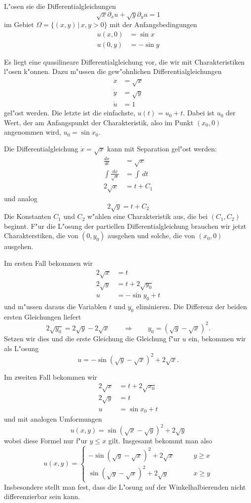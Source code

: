 L"osen sie die Differentialgleichungen
\[
\sqrt{x}\partial_x u+\sqrt{y}\partial_yu=1
\]
im Gebiet $\Omega=\{(x,y)\,|\, x,y>0\}$
mit der Anfangsbedingungen
\begin{align*}
u(x,0)&=\sin x\\
u(0,y)&=-\sin y
\end{align*}

\begin{loesung}
Es liegt eine quasilineare Differentialgleichung vor, die wir mit
Charakteristiken l"osen k"onnen. Dazu m"ussen die gew"ohnlichen
Differentialgleichungen
\begin{align*}
\dot x &=\sqrt{x} \\
\dot y &=\sqrt{y} \\
\dot u &=1
\end{align*}
gel"ost werden. Die letzte ist die einfachste, $u(t)=u_0 + t$. Dabei
ist $u_0$ der Wert, der am Anfangspunkt der Charakteristik, also
im Punkt $(x_0,0)$ angenommen wird, $u_0=\sin x_0$.

Die Differentialgleichung $\dot x=\sqrt{x}$ kann mit Separation
gel"ost werden:
\begin{align*}
\frac{dx}{dt}&=\sqrt{x}\\
\int\frac{dx}{\sqrt{x}}&=\int\,dt\\
2\sqrt{x}&=t+C_1
\end{align*}
und analog
\[
2\sqrt{y}=t+C_2
\]
Die Konstanten $C_1$ und $C_2$ w"ahlen eine Charakteristik aus,
die bei $(C_1,C_2)$ beginnt.
F"ur die L"osung der partiellen Differentialgleichung brauchen wir
jetzt Charakterstiken, die von $(0,y_0)$  ausgehen und solche, die
von $(x_0,0)$ ausgehen.

Im ersten Fall bekommen wir
\begin{align*}
2\sqrt{x}&=t\\
2\sqrt{y}&=t+2\sqrt{y_0}\\
u&=-\sin y_0 + t
\end{align*}
und m"ussen daraus die Variablen $t$ und $y_0$ eliminieren.
Die Differenz der beiden ersten Gleichungen liefert
\[
2\sqrt{y_0}=2\sqrt{y}-2\sqrt{x}
\qquad\Rightarrow\qquad
y_0
=
(\sqrt{y}-\sqrt{x})^2.
\]
Setzen wir dies und die erste Gleichung die Gleichung f"ur $u$ ein,
bekommen wir als L"osung
\[
u=-\sin
(\sqrt{y}-\sqrt{x})^2+2\sqrt{x}.
\]

Im zweiten Fall bekommen wir
\begin{align*}
2\sqrt{x}&=t+2\sqrt{x_0}\\
2\sqrt{y}&=t\\
u&=\sin x_0+t
\end{align*}
und mit analogen Umformungen
\[
u(x,y)=\sin(\sqrt{x}-\sqrt{y})^2+2\sqrt{y}
\]
wobei diese Formel nur f"ur $y\le x$ gilt. Insgesamt bekommt man also
\[
u(x,y)=
\begin{cases}
-\sin(\sqrt{y}-\sqrt{x})^2 +
2\sqrt{x}&\qquad y \ge x\\
\sin(\sqrt{y}-\sqrt{x})^2 +
2\sqrt{y}&\qquad x \ge y
\end{cases}
\]
Insbesondere stellt man fest, dass die L"osung auf der Winkelhalbierenden
nicht differenzierbar sein kann.


\end{loesung}
